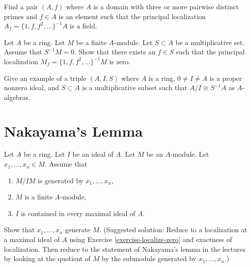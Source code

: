\begin{exercise}
\label{exercise-localization-is-field}
Find a pair $(A, f)$ where $A$ is a domain with three or more pairwise
distinct primes and $f \in A$ is an element such that the principal
localization $A_f = \{1, f, f^2, \ldots \}^{-1}A$ is a field.
\end{exercise}

\begin{exercise}
\label{exercise-localize-finite-module-zero}
Let $A$ be a ring. Let $M$ be a finite $A$-module. Let $S \subset A$
be a multiplicative set. Assume that $S^{-1}M = 0$. Show that there
exists an $f \in S$ such that the principal localization
$M_f = \{1, f, f^2, \ldots \}^{-1}M$ is zero.
\end{exercise}

\begin{exercise}
\label{exercise-localization-is-quotient}
Give an example of a triple $(A, I, S)$ where $A$ is a ring,
$0 \not = I \not = A$ is a proper nonzero ideal, and $S \subset A$
is a multiplicative subset
such that $A/I \cong S^{-1}A$ as $A$-algebras.
\end{exercise}




\section{Nakayama's Lemma}
\label{section-nakayama}

\begin{exercise}
\label{exercise-nakayama}
Let $A$ be a ring.
Let $I$ be an ideal of $A$.
Let $M$ be an $A$-module.
Let $x_1, \ldots, x_n \in M$.
Assume that
\begin{enumerate}
\item $M/IM$ is generated by $x_1, \ldots, x_n$,
\item $M$ is a finite $A$-module,
\item $I$ is contained in every maximal ideal of $A$.
\end{enumerate}
Show that $x_1, \ldots, x_n$ generate $M$. (Suggested solution:
Reduce to a localization at a maximal ideal of $A$ using
Exercise \ref{exercise-localize-zero} and exactness of localization.
Then reduce to the statement of Nakayama's lemma in the lectures
by looking at the quotient of $M$ by the submodule generated by
$x_1, \ldots, x_n$.)
\end{exercise}






